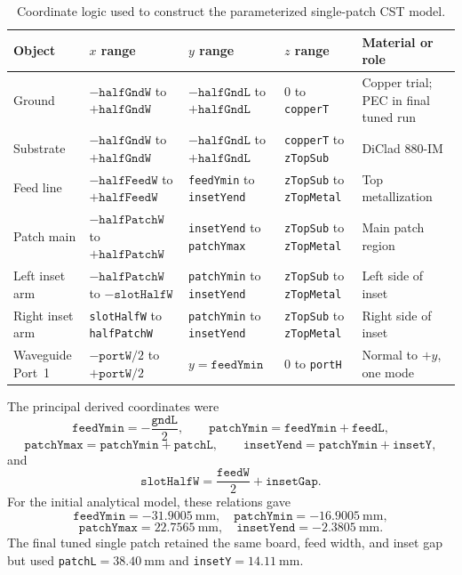 \begin{table}[H]
\centering
\caption{Coordinate logic used to construct the parameterized single-patch CST model.}
\label{tab:single-patch-coordinate-plan}
\footnotesize
\setlength{\tabcolsep}{3pt}
\renewcommand{\arraystretch}{1.18}
\begin{tabularx}{\textwidth}{@{}l
>{\raggedright\arraybackslash}X
>{\raggedright\arraybackslash}X
>{\raggedright\arraybackslash}X
>{\raggedright\arraybackslash}X@{}}
\toprule
\textbf{Object} & \textbf{$x$ range} & \textbf{$y$ range} & \textbf{$z$ range} & \textbf{Material or role} \\
\midrule
Ground & $-\texttt{halfGndW}$ to $+\texttt{halfGndW}$ & $-\texttt{halfGndL}$ to $+\texttt{halfGndL}$ & $0$ to \texttt{copperT} & Copper trial; PEC in final tuned run \\
Substrate & $-\texttt{halfGndW}$ to $+\texttt{halfGndW}$ & $-\texttt{halfGndL}$ to $+\texttt{halfGndL}$ & \texttt{copperT} to \texttt{zTopSub} & DiClad 880-IM \\
Feed line & $-\texttt{halfFeedW}$ to $+\texttt{halfFeedW}$ & \texttt{feedYmin} to \texttt{insetYend} & \texttt{zTopSub} to \texttt{zTopMetal} & Top metallization \\
Patch main & $-\texttt{halfPatchW}$ to $+\texttt{halfPatchW}$ & \texttt{insetYend} to \texttt{patchYmax} & \texttt{zTopSub} to \texttt{zTopMetal} & Main patch region \\
Left inset arm & $-\texttt{halfPatchW}$ to $-\texttt{slotHalfW}$ & \texttt{patchYmin} to \texttt{insetYend} & \texttt{zTopSub} to \texttt{zTopMetal} & Left side of inset \\
Right inset arm & \texttt{slotHalfW} to \texttt{halfPatchW} & \texttt{patchYmin} to \texttt{insetYend} & \texttt{zTopSub} to \texttt{zTopMetal} & Right side of inset \\
Waveguide Port~1 & $-\texttt{portW}/2$ to $+\texttt{portW}/2$ & $y=\texttt{feedYmin}$ & $0$ to \texttt{portH} & Normal to $+y$, one mode \\
\bottomrule
\end{tabularx}
\end{table}

The principal derived coordinates were
\[
\texttt{feedYmin}=-\frac{\texttt{gndL}}{2},
\qquad
\texttt{patchYmin}=\texttt{feedYmin}+\texttt{feedL},
\]
\[
\texttt{patchYmax}=\texttt{patchYmin}+\texttt{patchL},
\qquad
\texttt{insetYend}=\texttt{patchYmin}+\texttt{insetY},
\]
and
\[
\texttt{slotHalfW}=\frac{\texttt{feedW}}{2}+\texttt{insetGap}.
\]
For the initial analytical model, these relations gave
\[
\texttt{feedYmin}=-31.9005~\mathrm{mm},
\quad
\texttt{patchYmin}=-16.9005~\mathrm{mm},
\]
\[
\texttt{patchYmax}=22.7565~\mathrm{mm},
\quad
\texttt{insetYend}=-2.3805~\mathrm{mm}.
\]
The final tuned single patch retained the same board, feed width, and inset gap but used
\texttt{patchL}$=38.40~\mathrm{mm}$ and \texttt{insetY}$=14.11~\mathrm{mm}$.

